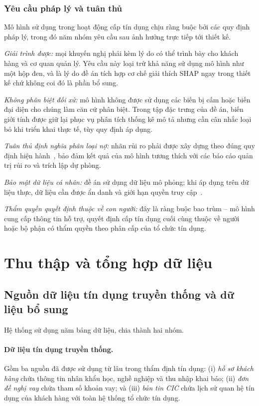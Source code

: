\subsubsection{Yêu cầu pháp lý và tuân thủ}

Mô hình sử dụng trong hoạt động cấp tín dụng chịu ràng buộc bởi các quy định pháp
lý, trong đó năm nhóm yêu cầu sau ảnh hưởng trực tiếp tới thiết kế.

\textit{Giải trình được:} mọi khuyến nghị phải kèm lý do có thể trình bày cho
khách hàng và cơ quan quản lý. Yêu cầu này loại trừ khả năng sử dụng mô hình như
một hộp đen, và là lý do đề án tích hợp cơ chế giải thích SHAP ngay trong thiết
kế chứ không coi đó là phần bổ sung.

\textit{Không phân biệt đối xử:} mô hình không được sử dụng các biến bị cấm hoặc
biến đại diện cho chúng làm căn cứ phân biệt. Trong tập đặc trưng của đề án, biến
giới tính được giữ lại phục vụ phân tích thống kê mô tả nhưng cần cân nhắc loại
bỏ khi triển khai thực tế, tùy quy định áp dụng.

\textit{Tuân thủ định nghĩa phân loại nợ:} nhãn rủi ro phải được xây dựng theo
đúng quy định hiện hành~\cite{tt11}, bảo đảm kết quả của mô hình tương thích với
các báo cáo quản trị rủi ro và trích lập dự phòng.

\textit{Bảo mật dữ liệu cá nhân:} đề án sử dụng dữ liệu mô phỏng; khi áp dụng
trên dữ liệu thực, dữ liệu cần được ẩn danh và giới hạn quyền truy
cập~\cite{tt15}.

\textit{Thẩm quyền quyết định thuộc về con người:} đây là ràng buộc bao trùm --
mô hình cung cấp thông tin hỗ trợ, quyết định cấp tín dụng cuối cùng thuộc về
người hoặc bộ phận có thẩm quyền theo phân cấp của tổ chức tín dụng.

\section{Thu thập và tổng hợp dữ liệu}
\label{sec:thu-thap-du-lieu}

\subsection{Nguồn dữ liệu tín dụng truyền thống và dữ liệu bổ sung}
\label{subsec:nguon-du-lieu}

Hệ thống sử dụng năm bảng dữ liệu, chia thành hai nhóm.

\paragraph{Dữ liệu tín dụng truyền thống.} Gồm ba nguồn đã được sử dụng từ lâu
trong thẩm định tín dụng: (i) \textit{hồ sơ khách hàng} chứa thông tin nhân khẩu
học, nghề nghiệp và thu nhập khai báo; (ii) \textit{đơn đề nghị vay} chứa tham số
khoản vay; và (iii) \textit{bản tin CIC} chứa lịch sử quan hệ tín dụng của khách
hàng với toàn hệ thống tổ chức tín dụng.

